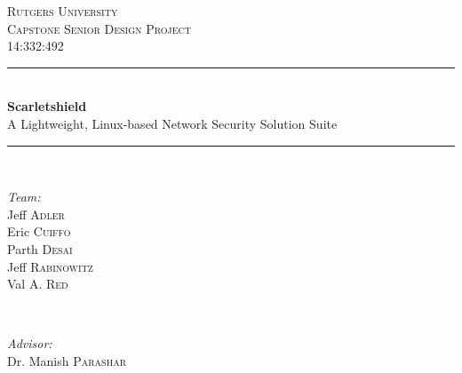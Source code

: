 \documentclass[11.5pt,letterpaper,titlepage]{report}
\begin{document}
\begin{titlepage}

\newcommand{\HRule}{\rule{\linewidth}{0.5mm}} %


\center %
 

\textsc{\LARGE Rutgers University}\\[1.5cm] %
\textsc{\Large Capstone Senior Design Project}\\[0.5cm] %
\textsc{\large 14:332:492}\\[1.0cm] %


\HRule \\[0.4cm]
{ \huge \bfseries Scarletshield}\\
  \Large A Lightweight, Linux-based Network Security Solution Suite \\[0.4cm] %
\HRule \\[3.5cm]
 

\begin{minipage}{0.4\textwidth}
\begin{flushleft} \large
\emph{Team:}\\
Jeff \textsc{Adler}\\ %
Eric \textsc{Cuiffo}\\
Parth \textsc{Desai}\\
Jeff \textsc{Rabinowitz}\\
Val A. \textsc{Red}
\end{flushleft}
\end{minipage}
~
\begin{minipage}{0.4\textwidth}
\begin{flushright} \large
\emph{Advisor:} \\
Dr. Manish \textsc{Parashar} %
\end{flushright}
\end{minipage}\\[4cm]


\end{titlepage}
\end{document}
